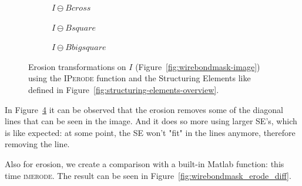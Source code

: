 \documentclass{article}
\begin{document}
\begin{figure}[H]
     \centering
     \begin{subfigure}[b]{0.3\textwidth}
         \centering
         
         \caption{$I \ominus Bcross$}
         \label{fig:wirebondmask_Bcross_eroded}
     \end{subfigure}
     \hfill
     \begin{subfigure}[b]{0.3\textwidth}
         \centering
         
         \caption{$I \ominus Bsquare$}
         \label{fig:wirebondmask_Bsquare_eroded}
     \end{subfigure}
     \hfill
     \begin{subfigure}[b]{0.3\textwidth}
         \centering
         
         \caption{$I \ominus Bbigsquare$}
         \label{fig:wirebondmask_Bbigsquare_eroded}
     \end{subfigure}
     
    \caption{Erosion transformations on $I$ (Figure~\ref{fig:wirebondmask-image}) using the \textsc{IPerode} function and the Structuring Elements like defined in Figure~\ref{fig:structuring-elements-overview}.}
    \label{fig:wirebondmask_eroded}
\end{figure}

In Figure~\ref{fig:wirebondmask_eroded} it can be observed that the erosion removes some of the diagonal lines that can be seen in the image. And it does so more using larger SE's, which is like expected: at some point, the SE won't "fit" in the lines anymore, therefore removing the line.

Also for erosion, we create a comparison with a built-in Matlab function: this time \textsc{imerode}. The result can be seen in Figure~\ref{fig:wirebondmask_erode_diff}.
\end{document}
